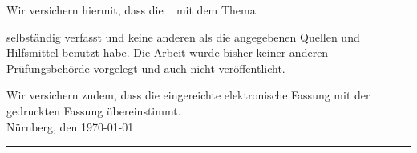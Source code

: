 Wir versichern hiermit, dass die \arbeit~ mit dem Thema
\begin{quote}
\textit{\titel} \textit{\untertitel }
\end{quote}
selbständig verfasst und keine anderen als die angegebenen Quellen und Hilfsmittel benutzt habe. Die Arbeit wurde bisher keiner anderen Prüfungsbehörde vorgelegt und auch nicht veröffentlicht.


Wir versichern zudem, dass die eingereichte elektronische Fassung mit der gedruckten Fassung übereinstimmt.\\[10ex]

Nürnberg, den \today \\[4ex]


\rule[-0.2cm]{10cm}{0.5pt} \\

\textsc{\autor} \\[10ex]

